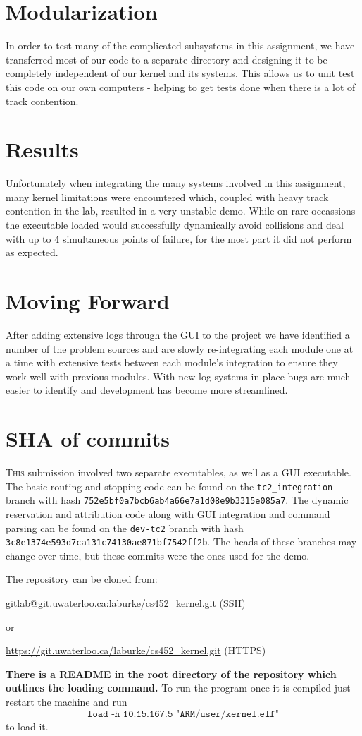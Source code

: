 \documentclass{amsart}
\begin{document}
\section*{Modularization}

In order to test many of the complicated subsystems in this assignment, we have
transferred most of our code to a separate directory and designing it to be
completely independent of our kernel and its systems. This allows us to unit
test this code on our own computers - helping to get tests done when there is a
lot of track contention.

\section*{Results}

Unfortunately when integrating the many systems involved in this assignment,
many kernel limitations were encountered which, coupled with heavy track
contention in the lab, resulted in a very unstable demo. While on rare
occassions the executable loaded would successfully dynamically avoid collisions
and deal with up to 4 simultaneous points of failure, for the most part it did
not perform as expected.

\section*{Moving Forward}

After adding extensive logs through the GUI to the project we have identified a
number of the problem sources and are slowly re-integrating each module one at a
time with extensive tests between each module's integration to ensure they work
well with previous modules. With new log systems in place bugs are much easier
to identify and development has become more streamlined.

\section*{SHA of commits}

\textsc{This} submission involved two separate executables, as well as a GUI
executable. The basic routing and stopping code can be found on the
\texttt{tc2\_integration} branch with hash
\texttt{752e5bf0a7bcb6ab4a66e7a1d08e9b3315e085a7}. The dynamic reservation and
attribution code along with GUI integration and command parsing can be found on
the \texttt{dev-tc2} branch with hash
\texttt{3c8e1374e593d7ca131c74130ae871bf7542ff2b}. The heads of these branches
may change over time, but these commits were the ones used for the demo.

\noindent The repository can be cloned from:

\url{gitlab@git.uwaterloo.ca:laburke/cs452_kernel.git} (SSH)

or

\url{https://git.uwaterloo.ca/laburke/cs452_kernel.git} (HTTPS)

\textbf{There is a README in the root directory of the repository which outlines
the loading command.} To run the program once it is compiled just restart the
machine and run \[\texttt{load -h 10.15.167.5 "ARM/user/kernel.elf"}\] to load
it.
\end{document}
